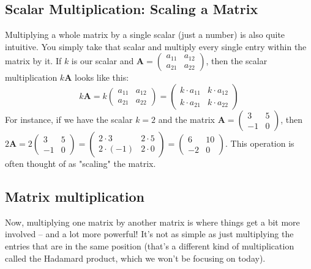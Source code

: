 \documentclass[11pt]{article}
\begin{document}
\subsection{Scalar Multiplication: Scaling a Matrix}

Multiplying a whole matrix by a single scalar (just a number) is also quite intuitive. You simply take that scalar and multiply every single entry within the matrix by it. If $k$ is our scalar and $\mathbf{A} = \begin{pmatrix} a_{11} & a_{12} \\ a_{21} & a_{22} \end{pmatrix}$, then the scalar multiplication $k\mathbf{A}$ looks like this:
\[ k\mathbf{A} = k \begin{pmatrix} a_{11} & a_{12} \\ a_{21} & a_{22} \end{pmatrix} = \begin{pmatrix} k \cdot a_{11} & k \cdot a_{12} \\ k \cdot a_{21} & k \cdot a_{22} \end{pmatrix} \]
For instance, if we have the scalar $k=2$ and the matrix $\mathbf{A} = \begin{pmatrix} 3 & 5 \\ -1 & 0 \end{pmatrix}$, then $2\mathbf{A} = 2 \begin{pmatrix} 3 & 5 \\ -1 & 0 \end{pmatrix} = \begin{pmatrix} 2 \cdot 3 & 2 \cdot 5 \\ 2 \cdot (-1) & 2 \cdot 0 \end{pmatrix} = \begin{pmatrix} 6 & 10 \\ -2 & 0 \end{pmatrix}$. This operation is often thought of as "scaling" the matrix.

\subsection{Matrix multiplication}

Now, multiplying one matrix by another matrix is where things get a bit more involved – and a lot more powerful! It's not as simple as just multiplying the entries that are in the same position (that's a different kind of multiplication called the Hadamard product, which we won't be focusing on today).
\end{document}
